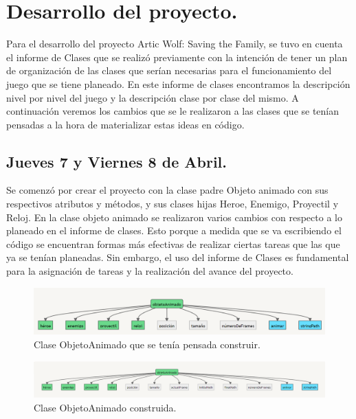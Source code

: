 \documentclass{article}
\begin{document}
\section{Desarrollo del proyecto.}
Para el desarrollo del proyecto Artic Wolf: Saving the Family, se tuvo en cuenta el informe de Clases que se realizó previamente con la intención de tener un plan de organización de las clases que serían necesarias para el funcionamiento del juego que se tiene planeado. En este informe de clases encontramos la descripción nivel por nivel del juego y la descripción clase por clase del mismo. A continuación veremos los cambios que se le realizaron a las clases que se tenían pensadas a la hora de materializar estas ideas en código.

\subsection{Jueves 7 y Viernes 8 de Abril.}

Se comenzó por crear el proyecto con la clase padre Objeto animado con sus respectivos atributos y métodos, y sus clases hijas Heroe, Enemigo, Proyectil y Reloj.
En la clase objeto animado se realizaron varios cambios con respecto a lo planeado en el informe de clases. Esto porque a medida que se va escribiendo el código se encuentran formas más efectivas de realizar ciertas tareas que las que ya se tenían planeadas. Sin embargo, el uso del informe de Clases es fundamental para la asignación de tareas y la realización del avance del proyecto.

\begin{figure}[h]
\includegraphics[scale=0.5]{Images/ObjetoAnimado.png}
\centering
\caption{Clase ObjetoAnimado que se tenía pensada construir.}
\label{fig:objetoAnimado}
\end{figure}

\begin{figure}[h]
\includegraphics[scale=0.6]{Images/newObjetoanimado.png}
\centering
\caption{Clase ObjetoAnimado construida.}
\label{fig:newobjetoAnimado}
\end{figure}
\end{document}
